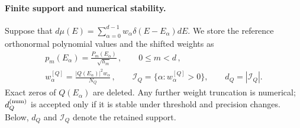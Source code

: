 \documentclass[a4paper,11pt]{article}
\def\dd{d}%
\theoremstyle{definition}
\theoremstyle{remark}
\newcommand{\dd}{\mathrm d}
\begin{document}
\paragraph{Finite support and numerical stability.}
Suppose that
$\dd\mu(E)=\sum_{\alpha=0}^{d-1}w_\alpha
\delta(E-E_\alpha)\dd E$.  We store the reference orthonormal polynomial
values and the shifted weights as 
\begin{equation}
\begin{gathered}
   p_m(E_\alpha)
   =\frac{P_m(E_\alpha)}{\sqrt{h_m}}\,,
   \qquad 0\le m<d\,,\\
   w_\alpha^{[Q]}
   =\frac{|Q(E_\alpha)|^2w_\alpha}{N_Q}\,,
   \qquad
   \mathcal I_Q=\{\alpha:w_\alpha^{[Q]}>0\},
   \qquad d_Q=|\mathcal I_Q|.
\end{gathered}
\end{equation}
Exact zeros of $Q(E_\alpha)$ are deleted.  Any further weight truncation
is numerical; $d_Q^{\rm(num)}$ is accepted only if it is stable under
threshold and precision changes.  Below, $d_Q$ and $\mathcal I_Q$
denote the retained support.
\end{document}
